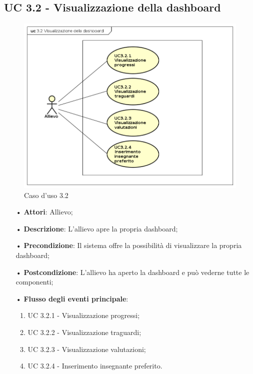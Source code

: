 \subsection{UC 3.2 - Visualizzazione della dashboard}
\begin{figure}[H]
\centering
\includegraphics[width=17cm]{img/UC32.png} 
\caption{Caso d'uso 3.2}\label{fig:32}
\end{figure}
\begin{itemize}
\item[•]\textbf{Attori}: Allievo;
\item[•]\textbf{Descrizione}: L’allievo apre la propria dashboard;
\item[•]\textbf{Precondizione}: Il sistema offre la possibilità di visualizzare la propria dashboard;
\item[•]\textbf{Postcondizione}: L’allievo ha aperto la dashboard e può vederne tutte le componenti;
\item[•]\textbf{Flusso degli eventi principale}:
\begin{enumerate}
\item UC 3.2.1 - Visualizzazione progressi;
\item UC 3.2.2 - Visualizzazione traguardi;
\item UC 3.2.3 - Visualizzazione valutazioni;
\item UC 3.2.4 - Inserimento insegnante preferito.
\end{enumerate}
\end{itemize}

